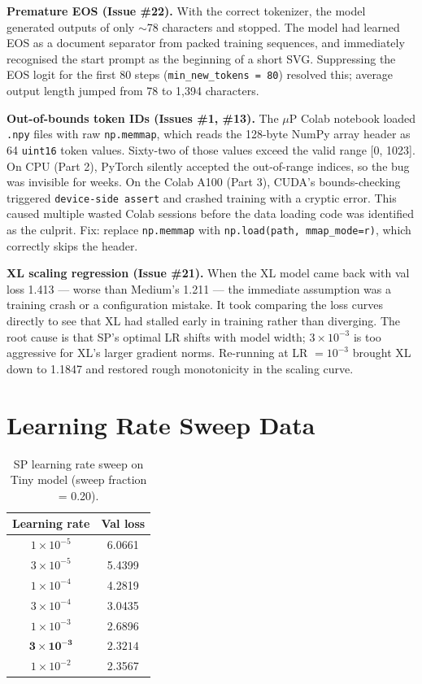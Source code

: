 \documentclass[10pt,letterpaper]{article}
\begin{document}
\textbf{Premature EOS (Issue \#22).}
With the correct tokenizer, the model generated outputs of only $\sim$78
characters and stopped. The model had learned EOS as a document separator
from packed training sequences, and immediately recognised the start prompt
as the beginning of a short SVG. Suppressing the EOS logit for the first
80 steps (\texttt{min\_new\_tokens = 80}) resolved this; average output
length jumped from 78 to 1,394 characters.

\textbf{Out-of-bounds token IDs (Issues \#1, \#13).}
The $\mu$P Colab notebook loaded \texttt{.npy} files with raw
\texttt{np.memmap}, which reads the 128-byte NumPy array header as 64
\texttt{uint16} token values. Sixty-two of those values exceed the valid
range [0, 1023]. On CPU (Part 2), PyTorch silently accepted the out-of-range
indices, so the bug was invisible for weeks. On the Colab A100 (Part 3),
CUDA's bounds-checking triggered \texttt{device-side assert} and crashed
training with a cryptic error. This caused multiple wasted Colab sessions
before the data loading code was identified as the culprit. Fix: replace
\texttt{np.memmap} with \texttt{np.load(path, mmap\_mode=\textquotesingle r\textquotesingle)},
which correctly skips the header.

\textbf{XL scaling regression (Issue \#21).}
When the XL model came back with val loss 1.413 — worse than Medium's 1.211
— the immediate assumption was a training crash or a configuration mistake.
It took comparing the loss curves directly to see that XL had stalled early
in training rather than diverging. The root cause is that SP's optimal LR
shifts with model width; $3 \times 10^{-3}$ is too aggressive for XL's
larger gradient norms. Re-running at LR $= 10^{-3}$ brought XL down to
1.1847 and restored rough monotonicity in the scaling curve.

\section{Learning Rate Sweep Data}
\label{app:lr_sweep}

\begin{table}[H]
\centering
\caption{SP learning rate sweep on Tiny model (sweep fraction = 0.20).}
\label{tab:lr_sweep}
\begin{tabular}{cc}
\toprule
Learning rate & Val loss \\
\midrule
$1 \times 10^{-5}$ & 6.0661 \\
$3 \times 10^{-5}$ & 5.4399 \\
$1 \times 10^{-4}$ & 4.2819 \\
$3 \times 10^{-4}$ & 3.0435 \\
$1 \times 10^{-3}$ & 2.6896 \\
$\mathbf{3 \times 10^{-3}}$ & $\mathbf{2.3214}$ \\
$1 \times 10^{-2}$ & 2.3567 \\
\bottomrule
\end{tabular}
\end{table}
\end{document}
